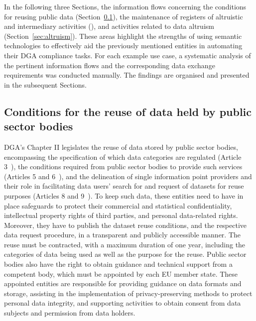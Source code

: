 In the following three Sections, the information flows concerning the conditions for reusing public data (Section~\ref{sec:reuse}), the maintenance of registers of altruistic and intermediary activities (), and activities related to data altruism (Section~\ref{sec:altruism}).
These areas highlight the strengths of using semantic technologies to effectively aid the previously mentioned entities in automating their DGA compliance tasks.
For each example use case, a systematic analysis of the pertinent information flows and the corresponding data exchange requirements was conducted manually.
The findings are organised and presented in the subsequent Sections.

\subsection{Conditions for the reuse of data held by public sector bodies}
\label{sec:reuse}

DGA's Chapter II legislates the reuse of data stored by public sector bodies, encompassing the specification of which data categories are regulated (Article 3~\citeyearpar{noauthor_regulation_2022}), the conditions required from public sector bodies to provide such services (Articles 5 and 6~\citeyearpar{noauthor_regulation_2022}), and the delineation of single information point providers and their role in facilitating data users' search for and request of datasets for reuse purposes (Articles 8 and 9~\citeyearpar{noauthor_regulation_2022}).
To keep such data, these entities need to have in place safeguards to protect their commercial and statistical confidentiality, intellectual property rights of third parties, and personal data-related rights.
Moreover, they have to publish the dataset reuse conditions, and the respective data request procedure, in a transparent and publicly accessible manner.
The reuse must be contracted, with a maximum duration of one year, including the categories of data being used as well as the purpose for the reuse. 
Public sector bodies also have the right to obtain guidance and technical support from a competent body, which must be appointed by each EU member state.
These appointed entities are responsible for providing guidance on data formats and storage, assisting in the implementation of privacy-preserving methods to protect personal data integrity, and supporting activities to obtain consent from data subjects and permission from data holders.

